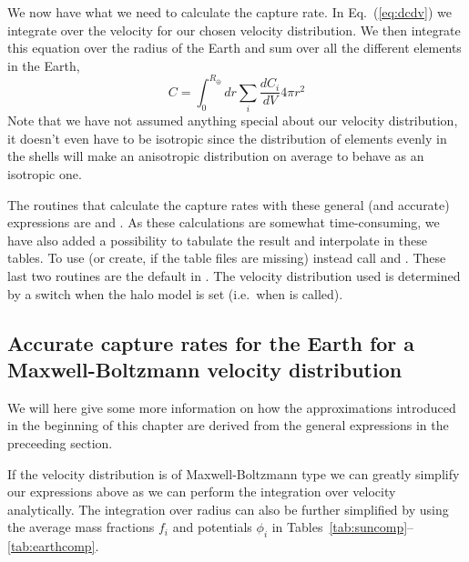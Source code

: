 We now have what we need to calculate the capture rate. In
Eq.~(\ref{eq:dcdv}) we integrate over the velocity for our chosen
velocity distribution. We then integrate this equation over the radius
of the Earth and sum over all the different elements in the Earth, 
\begin{equation}
   C = \int_0^{R_\oplus} dr \sum_i \frac{dC_i}{dV} 4 \pi r^2
\end{equation}
Note that we have not assumed anything special about our velocity
distribution, it doesn't even have to be isotropic since the
distribution of elements evenly in the shells will make an anisotropic
distribution on average to behave as an isotropic one. 

The routines that calculate the capture rates with these general (and
accurate) expressions are  and
. As these calculations are somewhat
time-consuming, we have also added a possibility to tabulate the
result and interpolate in these tables. To use (or create, if the
table files are missing) instead call  and
. These last two routines are the default in
\ds. The velocity distribution used is determined by a switch when the
halo model is set (i.e.\ when  is called).


\subsection{Accurate capture rates for the Earth for a
  Maxwell-Boltzmann velocity distribution}

We will here give some more information on how the approximations
introduced in the beginning of this chapter are derived from the
general expressions in the preceeding section.

If the velocity distribution is of Maxwell-Boltzmann type we can
greatly simplify our expressions above as we can perform the
integration over velocity analytically. The integration over radius
can also be further simplified by using the average mass fractions
$f_i$ and potentials $\phi_i$ in Tables~\ref{tab:suncomp}--\ref{tab:earthcomp}. 


